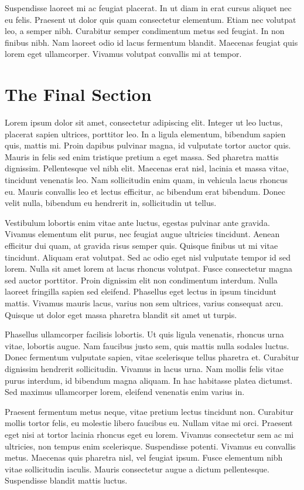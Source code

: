 Suspendisse laoreet mi ac feugiat placerat. In ut diam in erat cursus aliquet nec eu felis. Praesent ut dolor quis quam consectetur elementum. Etiam nec volutpat leo, a semper nibh. Curabitur semper condimentum metus sed feugiat. In non finibus nibh. Nam laoreet odio id lacus fermentum blandit. Maecenas feugiat quis lorem eget ullamcorper. Vivamus volutpat convallis mi at tempor.

\section{The Final Section}
Lorem ipsum dolor sit amet, consectetur adipiscing elit. Integer ut leo luctus, placerat sapien ultrices, porttitor leo. In a ligula elementum, bibendum sapien quis, mattis mi. Proin dapibus pulvinar magna, id vulputate tortor auctor quis. Mauris in felis sed enim tristique pretium a eget massa. Sed pharetra mattis dignissim. Pellentesque vel nibh elit. Maecenas erat nisl, lacinia et massa vitae, tincidunt venenatis leo. Nam sollicitudin enim quam, in vehicula lacus rhoncus eu. Mauris convallis leo et lectus efficitur, ac bibendum erat bibendum. Donec velit nulla, bibendum eu hendrerit in, sollicitudin ut tellus.

Vestibulum lobortis enim vitae ante luctus, egestas pulvinar ante gravida. Vivamus elementum elit purus, nec feugiat augue ultricies tincidunt. Aenean efficitur dui quam, at gravida risus semper quis. Quisque finibus ut mi vitae tincidunt. Aliquam erat volutpat. Sed ac odio eget nisl vulputate tempor id sed lorem. Nulla sit amet lorem at lacus rhoncus volutpat. Fusce consectetur magna sed auctor porttitor. Proin dignissim elit non condimentum interdum. Nulla laoreet fringilla sapien sed eleifend. Phasellus eget lectus in ipsum tincidunt mattis. Vivamus mauris lacus, varius non sem ultrices, varius consequat arcu. Quisque ut dolor eget massa pharetra blandit sit amet ut turpis.

Phasellus ullamcorper facilisis lobortis. Ut quis ligula venenatis, rhoncus urna vitae, lobortis augue. Nam faucibus justo sem, quis mattis nulla sodales luctus. Donec fermentum vulputate sapien, vitae scelerisque tellus pharetra et. Curabitur dignissim hendrerit sollicitudin. Vivamus in lacus urna. Nam mollis felis vitae purus interdum, id bibendum magna aliquam. In hac habitasse platea dictumst. Sed maximus ullamcorper lorem, eleifend venenatis enim varius in.

Praesent fermentum metus neque, vitae pretium lectus tincidunt non. Curabitur mollis tortor felis, eu molestie libero faucibus eu. Nullam vitae mi orci. Praesent eget nisi at tortor lacinia rhoncus eget eu lorem. Vivamus consectetur sem ac mi ultricies, non tempus enim scelerisque. Suspendisse potenti. Vivamus eu convallis metus. Maecenas quis pharetra nisl, vel feugiat ipsum. Fusce elementum nibh vitae sollicitudin iaculis. Mauris consectetur augue a dictum pellentesque. Suspendisse blandit mattis luctus.

